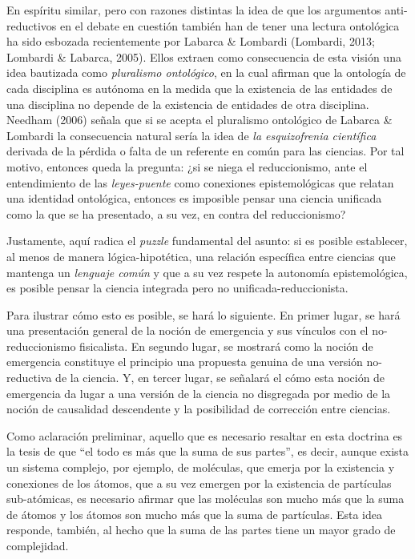 \documentclass[]{book}
\begin{document}
\begin{refsection}
En espíritu similar, pero con razones distintas la idea de que los
argumentos anti-reductivos en el debate en cuestión también han de tener
una lectura ontológica ha sido esbozada recientemente por Labarca \&
Lombardi (Lombardi, 2013; Lombardi \& Labarca, 2005). Ellos extraen como
consecuencia de esta visión una idea bautizada como \emph{pluralismo
ontológico}, en la cual afirman que la ontología de cada disciplina es
autónoma en la medida que la existencia de las entidades de una
disciplina no depende de la existencia de entidades de otra disciplina.
Needham (2006) señala que si se acepta el pluralismo ontológico de
Labarca \& Lombardi la consecuencia natural sería la idea de \emph{la
esquizofrenia científica} derivada de la pérdida o falta de un referente
en común para las ciencias. Por tal motivo, entonces queda la pregunta:
¿si se niega el reduccionismo, ante el entendimiento de las
\emph{leyes-puente} como conexiones epistemológicas que relatan una
identidad ontológica, entonces es imposible pensar una ciencia unificada
como la que se ha presentado, a su vez, en contra del reduccionismo?

Justamente, aquí radica el \emph{puzzle} fundamental del asunto: si es
posible establecer, al menos de manera lógica-hipotética, una relación
específica entre ciencias que mantenga un \emph{lenguaje común} y que a
su vez respete la autonomía epistemológica, es posible pensar la ciencia
integrada pero no unificada-reduccionista.

Para ilustrar cómo esto es posible, se hará lo siguiente. En primer
lugar, se hará una presentación general de la noción de emergencia y sus
vínculos con el no-reduccionismo fisicalista. En segundo lugar, se
mostrará como la noción de emergencia constituye el principio una
propuesta genuina de una versión no-reductiva de la ciencia. Y, en
tercer lugar, se señalará el cómo esta noción de emergencia da lugar a
una versión de la ciencia no disgregada por medio de la noción de
causalidad descendente y la posibilidad de corrección entre ciencias.

Como aclaración preliminar, aquello que es necesario resaltar en esta
doctrina es la tesis de que ``el todo es más que la suma de sus
partes'', es decir, aunque exista un sistema complejo, por ejemplo, de
moléculas, que emerja por la existencia y conexiones de los átomos, que
a su vez emergen por la existencia de partículas sub-atómicas, es
necesario afirmar que las moléculas son mucho más que la suma de átomos
y los átomos son mucho más que la suma de partículas. Esta idea
responde, también, al hecho que la suma de las partes tiene un mayor
grado de complejidad.


\end{refsection}
\end{document}

